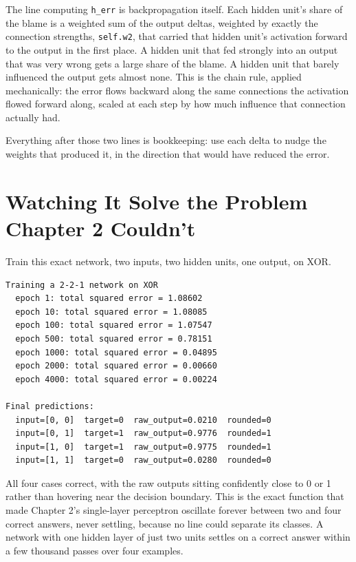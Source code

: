 The line computing \texttt{h\_err} is backpropagation itself. Each hidden unit's share of the blame is a weighted sum of the output deltas, weighted by exactly the connection strengths, \texttt{self.w2}, that carried that hidden unit's activation forward to the output in the first place. A hidden unit that fed strongly into an output that was very wrong gets a large share of the blame. A hidden unit that barely influenced the output gets almost none. This is the chain rule, applied mechanically: the error flows backward along the same connections the activation flowed forward along, scaled at each step by how much influence that connection actually had.

Everything after those two lines is bookkeeping: use each delta to nudge the weights that produced it, in the direction that would have reduced the error.

\section*{Watching It Solve the Problem Chapter 2 Couldn't}

Train this exact network, two inputs, two hidden units, one output, on XOR.

\begin{Verbatim}[fontsize=\small, frame=single, xleftmargin=1em, xrightmargin=1em]
Training a 2-2-1 network on XOR
  epoch 1: total squared error = 1.08602
  epoch 10: total squared error = 1.08085
  epoch 100: total squared error = 1.07547
  epoch 500: total squared error = 0.78151
  epoch 1000: total squared error = 0.04895
  epoch 2000: total squared error = 0.00660
  epoch 4000: total squared error = 0.00224

Final predictions:
  input=[0, 0]  target=0  raw_output=0.0210  rounded=0
  input=[0, 1]  target=1  raw_output=0.9776  rounded=1
  input=[1, 0]  target=1  raw_output=0.9775  rounded=1
  input=[1, 1]  target=0  raw_output=0.0280  rounded=0
\end{Verbatim}

All four cases correct, with the raw outputs sitting confidently close to 0 or 1 rather than hovering near the decision boundary. This is the exact function that made Chapter 2's single-layer perceptron oscillate forever between two and four correct answers, never settling, because no line could separate its classes. A network with one hidden layer of just two units settles on a correct answer within a few thousand passes over four examples.

